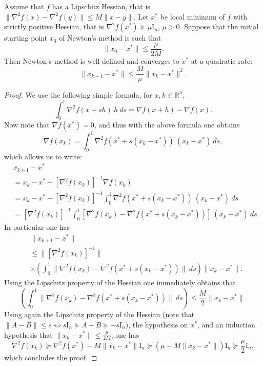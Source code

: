 \documentclass[openany]{now}
\newcommand{\mI}{\mathrm{I}}
\newcommand{\R}{\mathbb{R}}
\begin{document}
\begin{theorem}
\label{th:NM}
Assume that $f$ has a Lipschitz Hessian, that is $\| \nabla^2 f(x) - \nabla^2 f(y) \| \leq M \|x - y\|$. Let $x^*$ be local minimum of $f$ with strictly positive Hessian, that is $\nabla^2 f(x^*) \succeq \mu \mI_n$, $\mu > 0$. Suppose that the initial starting point $x_0$ of Newton's method is such that
$$\|x_0 - x^*\| \leq \frac{\mu}{2 M} .$$
Then Newton's method is well-defined and converges to $x^*$ at a quadratic rate:
$$\|x_{k+1} - x^*\| \leq \frac{M}{\mu} \|x_k - x^*\|^2.$$
\end{theorem}

\begin{proof}
We use the following simple formula, for $x, h \in \R^n$,
$$\int_0^1 \nabla^2 f(x + s h) \ h \ ds = \nabla f(x+h) - \nabla f(x) .$$
Now note that $\nabla f(x^*) = 0$, and thus with the above formula one obtains
$$\nabla f(x_k) = \int_0^1 \nabla^2 f(x^* + s (x_k - x^*)) \ (x_k - x^*) \ ds ,$$
which allows us to write:
\begin{align*}
& x_{k+1} - x^* \\
& = x_k - x^* - [\nabla^2 f(x_k)]^{-1} \nabla f(x_k) \\
& = x_k - x^* - [\nabla^2 f(x_k)]^{-1} \int_0^1 \nabla^2 f(x^* + s (x_k - x^*)) \ (x_k - x^*) \ ds \\
& = [\nabla^2 f(x_k)]^{-1} \int_0^1 [\nabla^2 f (x_k) - \nabla^2 f(x^* + s (x_k - x^*)) ] \ (x_k - x^*) \ ds .
\end{align*}
In particular one has
\begin{align*}
& \|x_{k+1} - x^*\| \\
& \leq \|[\nabla^2 f(x_k)]^{-1}\| \\
& \times \left( \int_0^1 \| \nabla^2 f (x_k) - \nabla^2 f(x^* + s (x_k - x^*)) \| \ ds \right) \|x_k - x^* \|.
\end{align*}
Using the Lipschitz property of the Hessian one immediately obtains that 
$$\left( \int_0^1 \| \nabla^2 f (x_k) - \nabla^2 f(x^* + s (x_k - x^*)) \| \ ds \right) \leq \frac{M}{2} \|x_k - x^*\| .$$
Using again the Lipschitz property of the Hessian (note that $\|A - B\| \leq s \Leftrightarrow s \mI_n \succeq A - B \succeq - s \mI_n$), the hypothesis on $x^*$, and an induction hypothesis that $\|x_k - x^*\| \leq \frac{\mu}{2M}$, one has
$$\nabla^2 f(x_k) \succeq \nabla^2 f(x^*) - M \|x_k - x^*\| \mI_n \succeq (\mu - M \|x_k - x^*\|) \mI_n \succeq \frac{\mu}{2} \mI_n ,$$
which concludes the proof.
\end{proof}
\end{document}

